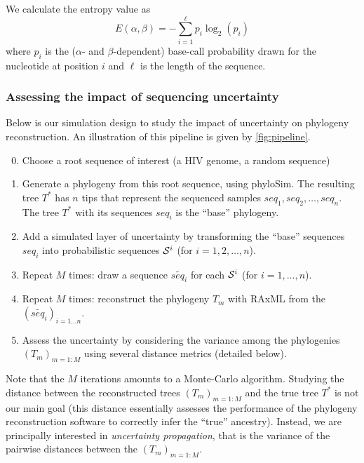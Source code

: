 \documentclass[10pt]{article}
\begin{document}
We calculate the entropy value as 
\begin{equation}
\label{eq:entropyDefinition}
E(\alpha, \beta) = -\sum_{i=1}^{\ell} p_i \log_2(p_i)
\end{equation}
where $p_i$ is the ($\alpha$- and $\beta$-dependent) base-call probability drawn for the nucleotide at position $i$ and $\ell$ is the length of the sequence.




\subsubsection{Assessing the impact of sequencing uncertainty}


Below is our simulation design to study the impact of uncertainty on phylogeny reconstruction.
An illustration of this pipeline is given by \autoref{fig:pipeline}.

\begin{enumerate}
\setcounter{enumi}{-1} 

\item Choose a root sequence of interest (\eg a HIV genome, a random sequence)

\item Generate a phylogeny from this root sequence, using \textsf{phyloSim}. The resulting tree $T^*$ has $n$ tips that represent the sequenced samples $seq_1, seq_2,\ldots, seq_n$. The tree $T^*$ with its sequences $seq_i$ is the ``base'' phylogeny.

\item Add a simulated layer of uncertainty by transforming the ``base'' sequences $seq_i$ into probabilistic sequences $\mathcal{S}^i$ (for $i=1,2,\ldots,n$).

\item Repeat $M$ times: 
draw a sequence $\widetilde{seq_i}$ for each $\mathcal{S}^i$ (for $i=1,\ldots, n$).

\item Repeat $M$ times: reconstruct the phylogeny $T_m$ with \textsf{RAxML} from the $(\widetilde{seq_i})_{i=1\ldots n}$. 

\item \label{item:assess} Assess the uncertainty by considering the variance among the phylogenies $(T_m)_{m=1:M}$ using several distance metrics (detailed below).
\end{enumerate}

\noindent Note that the $M$ iterations amounts to a Monte-Carlo algorithm.
Studying the distance between the reconstructed trees $(T_m)_{m=1:M}$ and the true tree $T^*$ is not our main goal (this distance essentially assesses the performance of the phylogeny reconstruction software to correctly infer the ``true'' ancestry).
Instead, we are principally interested in \emph{uncertainty propagation}, that is the variance of the pairwise distances between the $(T_m)_{m=1:M}$.
\end{document}
